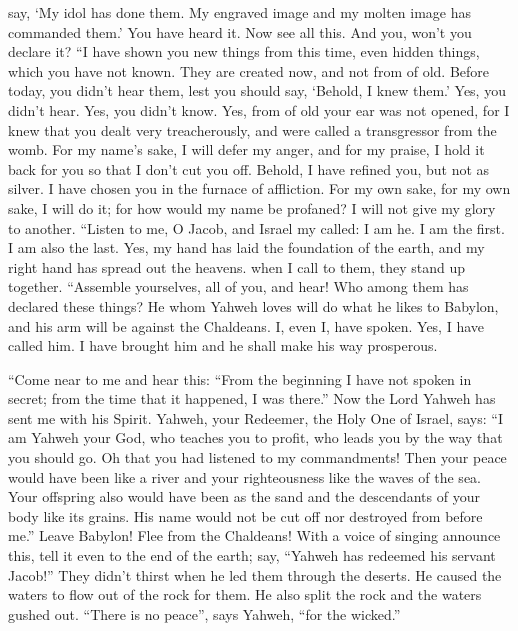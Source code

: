 say, `My idol has done them. My engraved image and my molten image has
commanded them.'  You have heard it. Now see all this. And
you, won't you declare it? ``I have shown you new things from this time,
even hidden things, which you have not known.  They are
created now, and not from of old. Before today, you didn't hear them,
lest you should say, `Behold, I knew them.'  Yes, you didn't
hear. Yes, you didn't know. Yes, from of old your ear was not opened,
for I knew that you dealt very treacherously, and were called a
transgressor from the womb.  For my name's sake, I will
defer my anger, and for my praise, I hold it back for you so that I
don't cut you off.  Behold, I have refined you, but not as
silver. I have chosen you in the furnace of affliction. 
For my own sake, for my own sake, I will do it; for how would my name be
profaned? I will not give my glory to another.  ``Listen to
me, O Jacob, and Israel my called: I am he. I am the first. I am also
the last.  Yes, my hand has laid the foundation of the
earth, and my right hand has spread out the heavens. when I call to
them, they stand up together.  ``Assemble yourselves, all
of you, and hear! Who among them has declared these things? He whom
Yahweh loves will do what he likes to Babylon, and his arm will be
against the Chaldeans.  I, even I, have spoken. Yes, I have
called him. I have brought him and he shall make his way prosperous.

 ``Come near to me and hear this: ``From the beginning I
have not spoken in secret; from the time that it happened, I was
there.'' Now the Lord Yahweh has sent me with his Spirit. 
Yahweh, your Redeemer, the Holy One of Israel, says: ``I am Yahweh your
God, who teaches you to profit, who leads you by the way that you should
go.  Oh that you had listened to my commandments! Then your
peace would have been like a river and your righteousness like the waves
of the sea.  Your offspring also would have been as the
sand and the descendants of your body like its grains. His name would
not be cut off nor destroyed from before me.''  Leave
Babylon! Flee from the Chaldeans! With a voice of singing announce this,
tell it even to the end of the earth; say, ``Yahweh has redeemed his
servant Jacob!''  They didn't thirst when he led them
through the deserts. He caused the waters to flow out of the rock for
them. He also split the rock and the waters gushed out. 
``There is no peace'', says Yahweh, ``for the wicked.''

